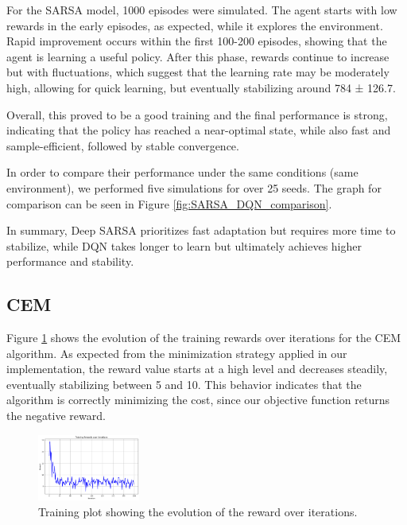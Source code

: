 \documentclass[../CSC_52081_EP.tex]{subfiles}
\begin{document}
For the SARSA model, 1000 episodes were simulated. The agent starts with low rewards in the early episodes, as expected, while it explores the environment. Rapid improvement occurs within the first 100-200 episodes, showing that the agent is learning a useful policy. After this phase, rewards continue to increase but with fluctuations, which suggest that the learning rate may be moderately high, allowing for quick learning, but eventually stabilizing around 784 ± 126.7.

Overall, this proved to be a good training and the final performance is strong, indicating that the policy has reached a near-optimal state, while also fast and sample-efficient, followed by stable convergence.

In order to compare their performance under the same conditions (same environment), we performed five simulations for over 25 seeds. The graph for comparison can be seen in Figure \ref{fig:SARSA_DQN_comparison}.


In summary, Deep SARSA prioritizes fast adaptation but requires more time to stabilize, while DQN takes longer to learn but ultimately achieves higher performance and stability.

\subsection{CEM}

Figure \ref{fig:train_plot} shows the evolution of the training rewards over iterations for the CEM algorithm. As expected from the minimization strategy applied in our implementation, the reward value starts at a high level and decreases steadily, eventually stabilizing between 5 and 10. This behavior indicates that the algorithm is correctly minimizing the cost, since our objective function returns the negative reward.

\begin{figure}[H]
    \centering
    \includegraphics[width=0.3\textwidth]{figures/CEM_train.png}
    \caption{Training plot showing the evolution of the reward over iterations.}
    \label{fig:train_plot}
\end{figure}
\end{document}
